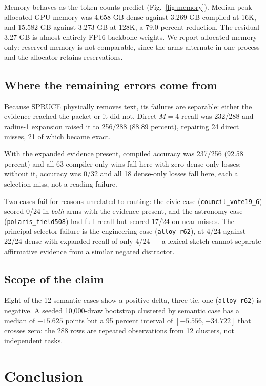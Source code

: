 \documentclass[conference]{IEEEtran}
\begin{document}
Memory behaves as the token counts predict (Fig.~\ref{fig:memory}). Median peak
allocated GPU memory was 4.658 GB dense against 3.269 GB compiled at 16K, and
15.582 GB against 3.273 GB at 128K, a 79.0 percent reduction. The residual 3.27 GB is
almost entirely FP16 backbone weights. We report allocated memory only: reserved memory is not comparable, since the arms
alternate in one process and the allocator retains reservations.

\subsection{Where the remaining errors come from}

Because SPRUCE physically removes text, its failures are separable: either the
evidence reached the packet or it did not.
Direct $M=4$ recall was 232/288 and radius-1 expansion raised it to 256/288
(88.89 percent), repairing 24 direct misses, 21 of which became exact.

With the expanded evidence present, compiled
accuracy was 237/256 (92.58 percent) and all 63 compiler-only wins fall here with zero
dense-only losses; without it, accuracy was 0/32 and all 18 dense-only losses fall
here, each a selection miss, not a reading failure.

Two cases fail for reasons unrelated to routing: the civic case
(\texttt{council\_vote19\_6}) scored 0/24 in \emph{both} arms with the evidence
present, and the astronomy case (\texttt{polaris\_field508}) had full recall but
scored 17/24 on near-misses. The principal selector failure is the engineering case
(\texttt{alloy\_r62}), at 4/24 against 22/24 dense with expanded recall of only
4/24 --- a lexical sketch cannot separate affirmative evidence from a similar negated
distractor.

\subsection{Scope of the claim}

Eight of the 12 semantic cases show a positive delta, three tie, one
(\texttt{alloy\_r62}) is negative. A seeded 10,000-draw bootstrap clustered by
semantic case has a median of $+15.625$ points but a 95 percent interval of
$[-5.556, +34.722]$ that crosses zero: the 288 rows are repeated observations from
12 clusters, not independent tasks.

\section{Conclusion}
\end{document}

